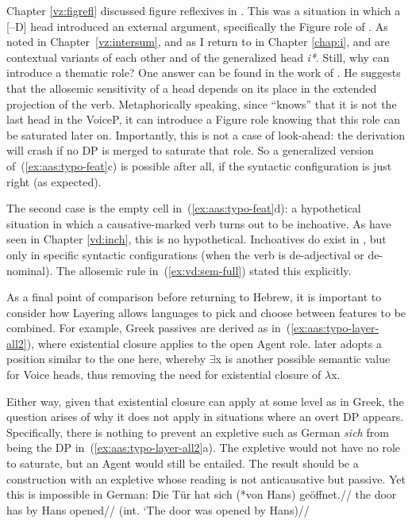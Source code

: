 Chapter \ref{vz:figrefl} discussed figure reflexives in {\tnif}. This was a situation in which a [--D] head introduced an external argument, specifically the Figure role of {\pz}. As noted in Chapter~\ref{vz:intersum}, and as I return to in Chapter \ref{chap:i}, {\pz} and {\vz} are contextual variants of each other and of the generalized head \emph{i*}. Still, why can {\pz} introduce a thematic role? One answer can be found in the work of \cite{wood15springer}. He suggests that the allosemic sensitivity of a head depends on its place in the extended projection of the verb. Metaphorically speaking, since {\pz} ``knows'' that it is not the last head in the VoiceP, it can introduce a Figure role knowing that this role can be saturated later on. Importantly, this is not a case of look-ahead: the derivation will crash if no DP is merged to saturate that role. So a generalized version of~(\ref{ex:aas:typo-feat}c) is possible after all, if the syntactic configuration is just right (as expected).

The second case is the empty cell in~(\ref{ex:aas:typo-feat}d): a hypothetical situation in which a causative-marked verb turns out to be inchoative. As have seen in Chapter \ref{vd:inch}, this is no hypothetical. Inchoatives do exist in {\thif}, but only in specific syntactic configurations (when the verb is de-adjectival or de-nominal). The allosemic rule in~(\ref{ex:vd:sem-full}) stated this explicitly.

As a final point of comparison before returning to Hebrew, it is important to consider how Layering allows languages to pick and choose between features to be combined. For example, Greek passives are derived as in~(\ref{ex:aas:typo-layer-all2}), where existential closure applies to the open Agent role. \cite{schaefer17oup} later adopts a position similar to the one here, whereby $\exists$x is another possible semantic value for Voice heads, thus removing the need for existential closure of $\lambda$x.

Either way, given that existential closure can apply at some level as in Greek, the question arises of why it does not apply in situations where an overt DP appears. Specifically, there is nothing to prevent an expletive such as German \emph{sich} from being the DP in~(\ref{ex:aas:typo-layer-all2}a). The expletive would not have no role to saturate, but an Agent would still be entailed. The result should be a construction with an expletive whose reading is not anticausative but passive. Yet this is impossible in German:
\ex \begingl
	\gla Die T\"ur hat sich (*von Hans) ge\"offnet.//
	\glb the door has  by Hans opened//
	\glft (int. `The door was opened by Hans)//
	\endgl
\xe

